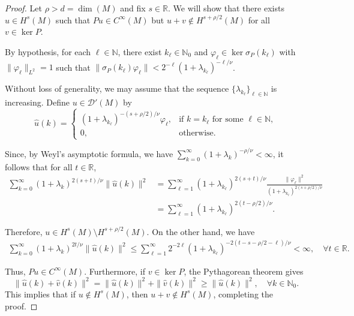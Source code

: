\documentclass{amsart}
\theoremstyle{definition}
\theoremstyle{remark}
\numberwithin{equation}{section}
\begin{document}
	\begin{proof}
		Let $\rho>d = \dim(M)$ and fix $s\in\mathbb{R}$. We will show that there exists $u\in H^s(M)$ such that $Pu\in C^\infty(M)$ but $u+v\notin H^{s+\rho/2}(M)$ for all $v\in\ker P$.
		
		By hypothesis, for each $\ell\in\mathbb{N}$, there exist $k_\ell\in\mathbb{N}_0$ and $\varphi_\ell\in\ker\sigma_P(k_\ell)$ with $\|\varphi_\ell\|_{L^2}=1$ such that $\|\sigma_P(k_\ell)\varphi_\ell\|<2^{-\ell}(1+\lambda_{k_\ell})^{-\ell/\nu}$.
		
		Without loss of generality, we may assume that the sequence $\{\lambda_{k_\ell}\}_{\ell\in\mathbb{N}}$ is increasing. Define $u\in\mathscr{D}'(M)$ by
		\[
		\widehat{u}(k)=\begin{cases}
			(1+\lambda_{k_\ell})^{-(s+\rho/2)/\nu}\varphi_\ell,&\text{if } k=k_\ell \text{ for some } \ell\in\mathbb{N},\\
			0,&\text{otherwise}.
		\end{cases}
		\]
		
		Since, by Weyl's asymptotic formula, we have $
			\sum_{k=0}^\infty (1+\lambda_k)^{-\rho/\nu}<\infty$, it follows that for all $t\in\mathbb{R}$,
		\begin{align*}
			\sum_{k=0}^\infty (1+\lambda_k)^{2(s+t)/\nu}\|\widehat{u}(k)\|^2 
			&= \sum_{\ell=1}^\infty (1+\lambda_{k_\ell})^{2(s+t)/\nu} \frac{\|\varphi_\ell\|^2}{(1+\lambda_{k_\ell})^{2(s+\rho/2)/\nu}}\\
			&= \sum_{\ell=1}^{\infty}(1+\lambda_{k_\ell})^{2(t-\rho/2)/\nu}.
		\end{align*}
		
		Therefore, $u\in H^s(M)\setminus H^{s+\rho/2}(M)$. On the other hand, we have
		\begin{align*}
			\sum_{k=0}^\infty (1+\lambda_k)^{2t/\nu}\|\widehat{u}(k)\|^2 
			\leq \sum_{\ell=1}^\infty 2^{-2\ell}(1+\lambda_{k_\ell})^{-2(t-s-\rho/2-\ell)/\nu} < \infty,\quad \forall t\in\mathbb{R}.
		\end{align*}
		
		Thus, $Pu\in C^\infty(M)$. Furthermore, if $v\in\ker P$, the Pythagorean theorem gives
		\begin{equation*}
			\|\widehat{u}(k)+\widehat{v}(k)\|^2 = \|\widehat{u}(k)\|^2+\|\widehat{v}(k)\|^2 \geq \|\widehat{u}(k)\|^2,\quad \forall k\in\mathbb{N}_0.
		\end{equation*}
		This implies that if $u\notin H^s(M)$, then $u+v\notin H^s(M)$, completing the proof.
	\end{proof}
	
\end{document}
